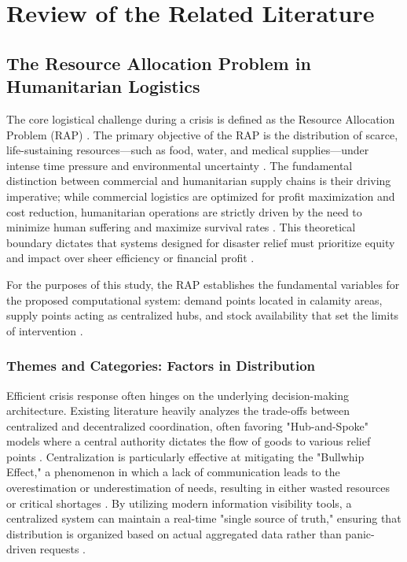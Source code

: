 \chapter{Review of the Related Literature}

\section{The Resource Allocation Problem in Humanitarian Logistics}
The core logistical challenge during a crisis is defined as the Resource Allocation Problem (RAP) \cite{holguin2012unique}. The primary objective of the RAP is the distribution of scarce, life-sustaining resources—such as food, water, and medical supplies—under intense time pressure and environmental uncertainty \cite{kovacs2007humanitarian}. The fundamental distinction between commercial and humanitarian supply chains is their driving imperative; while commercial logistics are optimized for profit maximization and cost reduction, humanitarian operations are strictly driven by the need to minimize human suffering and maximize survival rates \cite{starr2014, van2010using}. This theoretical boundary dictates that systems designed for disaster relief must prioritize equity and impact over sheer efficiency or financial profit \cite{gutjahr2018}.

For the purposes of this study, the RAP establishes the fundamental variables for the proposed computational system: demand points located in calamity areas, supply points acting as centralized hubs, and stock availability that set the limits of intervention \cite{cui2010}.

\subsection{Themes and Categories: Factors in Distribution}
Efficient crisis response often hinges on the underlying decision-making architecture. Existing literature heavily analyzes the trade-offs between centralized and decentralized coordination, often favoring "Hub-and-Spoke" models where a central authority dictates the flow of goods to various relief points \cite{balcik2010}. Centralization is particularly effective at mitigating the "Bullwhip Effect," a phenomenon in which a lack of communication leads to the overestimation or underestimation of needs, resulting in either wasted resources or critical shortages \cite{lee1997information}. By utilizing modern information visibility tools, a centralized system can maintain a real-time "single source of truth," ensuring that distribution is organized based on actual aggregated data rather than panic-driven requests \cite{balcik2010}.

